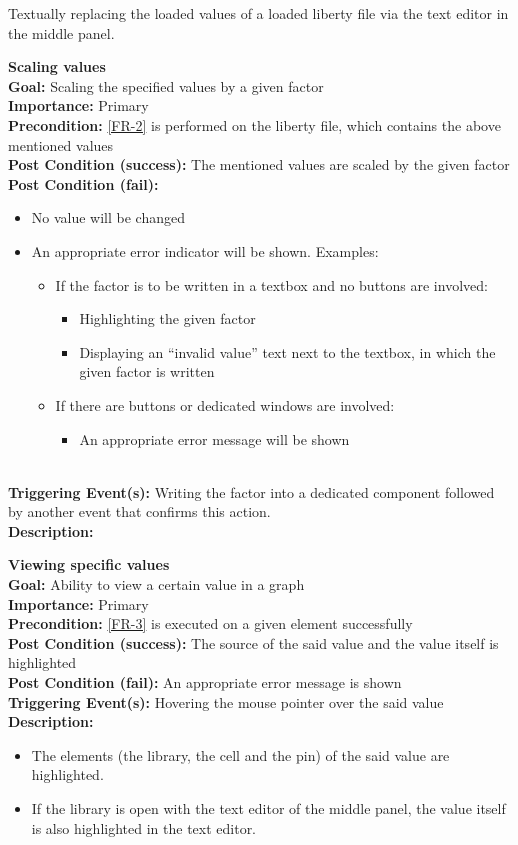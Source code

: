 \documentclass[10pt,a4paper]{report}
\newcommand{\FRDescription}[8]{
    \textbf{#1} \leavevmode \\
    \textbf{Goal: } #2 \leavevmode \\
    \textbf{Importance: } #3 \leavevmode \\
    \textbf{Precondition: } #4 \leavevmode \\
    \textbf{Post Condition (success): } #5 \leavevmode \\
    \textbf{Post Condition (fail): } #6 \leavevmode \\
    \textbf{Triggering Event(s): } #7 \leavevmode \\
    \textbf{Description: } \leavevmode \\ 
    #8}
\begin{document}
\begin{FR}
{    }
    {Textually replacing the loaded values of a loaded liberty file via the text editor in the middle panel.}
    \item \FRDescription{Scaling values}
    {Scaling the specified values by a given factor}
    {Primary}
    {\ref{FR-2} is performed on the liberty file, which contains the above mentioned values}
    {The mentioned values are scaled by the given factor}
    {\begin{itemize}
        \item No value will be changed
        \item An appropriate error indicator will be shown. Examples:
        \begin{itemize}
            \item If the factor is to be written in a textbox and no buttons are involved:
            \begin{itemize}
                \item Highlighting the given factor
                \item Displaying an “invalid value” text next to the textbox, in which the given factor is written
            \end{itemize}
            \item If there are buttons or dedicated windows are involved:
            \begin{itemize}
                \item An appropriate error message will be shown
            \end{itemize}
        \end{itemize}
    \end{itemize}}
    {Writing the factor into a dedicated component followed by another event that confirms this action.}
    \item \FRDescription{Viewing specific values}
    {Ability to view a certain value in a graph}
    {Primary}
    {\ref{FR-3} is executed on a given element successfully}
    {The source of the said value and the value itself is highlighted}
    {An appropriate error message is shown}
    {Hovering the mouse pointer over the said value}
    {\begin{itemize}
        \item The elements (the library, the cell and the pin) of the said value are highlighted.
        \item If the library is open with the text editor of the middle panel, the value itself is also highlighted in the text editor.
    \end{itemize}}

\end{FR}
\end{document}
